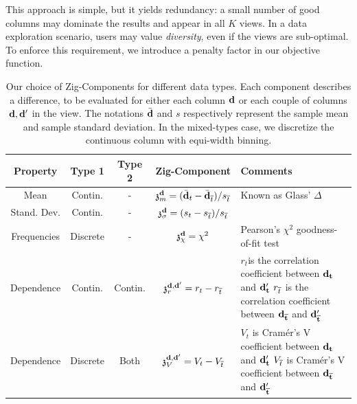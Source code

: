 This approach is simple, but it yields redundancy: a small number of good
columns may dominate the results and appear in all $K$ views. In a data
exploration scenario, users may value \emph{diversity}, even if the views are
sub-optimal. To enforce this requirement, we introduce a penalty factor in our
objective function.
\begin{table}[t!]
    \centering
    \begin{tabular}{ccccp{9cm}}
      \hline
    \rowcolor{gray!50}
      Property & Type 1 & Type 2 & Zig-Component & Comments\\
      \hline
      Mean & Contin.  & - &
      $  \mathfrak{z}_m^{\bf{d}}  = (\bar{\bf{d}}_t - \bar{\bf{d}}_{\overline{t}}) / s_{\overline{t}}$ & 
      Known as Glass' $\Delta$~\cite{hedges2014statistical}\\
      Stand. Dev.& Contin.  & - &
      $ \mathfrak{z}_{\sigma}^{\bf{d}}=(s_t-s_{\overline{t}})/s_{\overline{t}}$ & \\
      Frequencies & Discrete & - & 
      $\mathfrak{z}_\chi ^{\bf{d}}= \chi^2$ &
      Pearson's $\chi^2$ goodness-of-fit test~\cite{wasserman2013all}\\
      Dependence & Contin. & Contin. & $\mathfrak{z}_r^{\bf{d}, \bf{d}'}  = r_t - r_{\overline{t}} $ & 
      $r_t$is the correlation coefficient between $\bf{d}_t$ and  $\bf{d}'_t$\newline
      $r_{\overline{t}}$ is the correlation coefficient between $\bf{d}_{\overline{t}}$ and
      $\bf{d}'_{\overline{t}}$~\cite{wasserman2013all}\\
     Dependence  & Discrete & Both & $ \mathfrak{z}_V^{\bf{d}, \bf{d}'} = V_t - V_{\overline{t}} $ &
           $V_t$ is Cram\'er's V coefficient between $\bf{d}_t$ and  $\bf{d}'_t$ \newline
           $V_{\overline{t}}$ is Cram\'er's V coefficient between $\bf{d}_{\overline{t}}$ and
           $\bf{d}'_{\overline{t}}$~\cite{cohen1977statistical} \\ 
      \hline
    \end{tabular}
    \caption{Our choice of Zig-Components for different data types. Each
        component describes a difference, to be evaluated for either each
        column $\bf{d}$ or each couple of columns $\bf{d}, \bf{d}'$ in the
        view. The notations $\bar{\bf{d}}$ and $s$ respectively represent the
        sample mean and sample standard deviation. In the mixed-types case, we
        discretize the continuous column with equi-width binning.}
    \label{tab:dissim}
\end{table}

